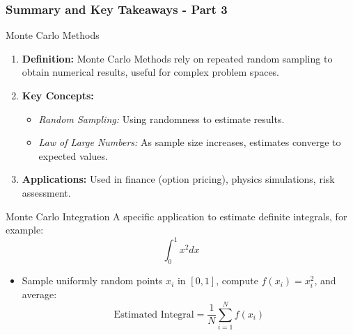 \documentclass[aspectratio=169]{beamer}
\begin{document}
\begin{frame}[fragile]
    \frametitle{Summary and Key Takeaways - Part 3}
    
    \begin{block}{Monte Carlo Methods}
        \begin{enumerate}
            \item \textbf{Definition:} 
            Monte Carlo Methods rely on repeated random sampling to obtain numerical results, useful for complex problem spaces.
            
            \item \textbf{Key Concepts:}
            \begin{itemize}
                \item \textit{Random Sampling:} Using randomness to estimate results.
                \item \textit{Law of Large Numbers:} As sample size increases, estimates converge to expected values.
            \end{itemize}
            
            \item \textbf{Applications:} 
            Used in finance (option pricing), physics simulations, risk assessment.
        \end{enumerate}
    \end{block}
    
    \begin{block}{Monte Carlo Integration}
        A specific application to estimate definite integrals, for example:
        \begin{equation}
            \int_0^1 x^2 dx
        \end{equation}
        \begin{itemize}
            \item Sample uniformly random points \( x_i \) in \( [0, 1] \), compute \( f(x_i) = x_i^2 \), and average:
            \begin{equation}
                \text{Estimated Integral} = \frac{1}{N} \sum_{i=1}^{N} f(x_i)
            \end{equation}
        \end{itemize}
    \end{block}
\end{frame}
\end{document}

